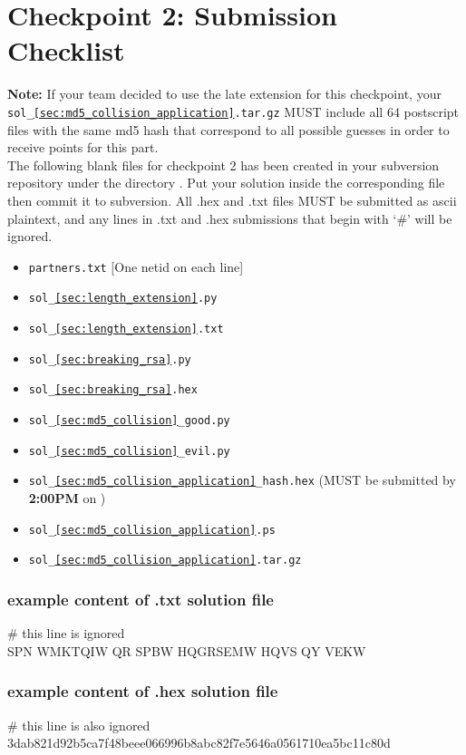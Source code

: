 \documentclass[letterpaper,12pt]{report}
\begin{document}
\newpage

\section*{Checkpoint 2: Submission Checklist}
  
\textbf{Note:} If your team decided to use the late extension for this checkpoint, your \texttt{sol\_\ref{sec:md5_collision_application}.tar.gz} MUST include all 64 postscript files with the same md5 hash that correspond to all possible guesses in order to receive points for this part.\\

The following blank files for checkpoint 2 has been created in your subversion repository under the directory \mpnumber.  Put your solution inside the corresponding file then commit it to subversion. All .hex and .txt files MUST be submitted as ascii plaintext, and any lines in .txt and .hex submissions that begin with `\#' will be ignored.

\begin{itemize}
\item {\tt partners.txt} [One netid on each line]
\item {\tt sol\_\ref{sec:length_extension}.py}
\item {\tt sol\_\ref{sec:length_extension}.txt}
\item {\tt sol\_\ref{sec:breaking_rsa}.py}
\item {\tt sol\_\ref{sec:breaking_rsa}.hex}
\item {\tt sol\_\ref{sec:md5_collision}\_good.py}
\item {\tt sol\_\ref{sec:md5_collision}\_evil.py}
\item {\tt sol\_\ref{sec:md5_collision_application}\_hash.hex} (MUST be submitted by \textbf{2:00PM} on \duedate)
\item {\tt sol\_\ref{sec:md5_collision_application}.ps}
\item {\tt sol\_\ref{sec:md5_collision_application}.tar.gz}
\end{itemize}

\subsubsection*{example content of .txt solution file}
\begin{mdframed}
\# this line is ignored\\
SPN WMKTQIW QR SPBW HQGRSEMW HQVS QY VEKW 
\end{mdframed}
\subsubsection*{example content of .hex solution file}
\begin{mdframed}
\# this line is also ignored \\
3dab821d92b5ca7f48beee066996b8abc82f7e5646a0561710ea5bc11c80d
\end{mdframed}
\end{document}
